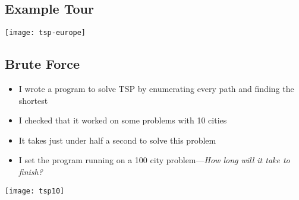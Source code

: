 
\begin{slide}
\section{Example Tour}
\vspace{-1cm}
\begin{center}
  \texttt{[image: tsp-europe]}
\end{center}

\end{slide}


\begin{slide}
\section{Brute Force}

\begin{minipage}{14cm}
\begin{PauseHighLight}
  \begin{itemize}
  \item I wrote a program to solve TSP by enumerating every path and
    finding the shortest\pause
  \item I checked that it worked on some problems with 10 cities\pause
  \item It takes just under half a second to solve this problem\pause
  \item I set the program running on a 100 city
      problem\pause---\emph{How long will it take to finish?}\pause
  \end{itemize}
\end{PauseHighLight}
\end{minipage}\hfill
\begin{minipage}{9cm}
\texttt{[image: tsp10]}
\end{minipage}

\end{slide}



